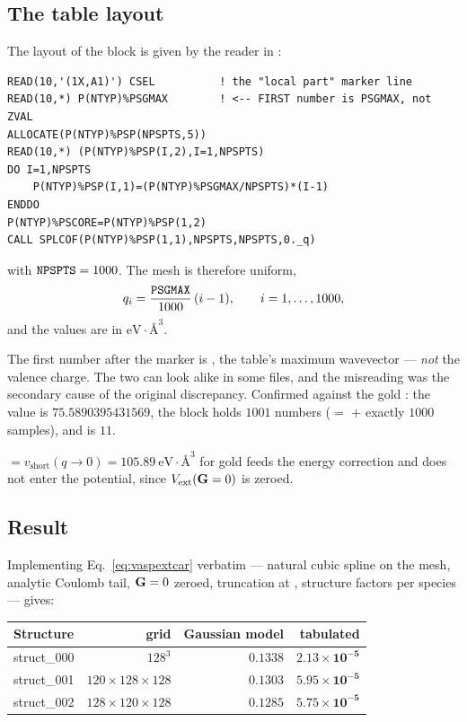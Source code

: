 \subsection{The \texorpdfstring{}{POTCAR} table layout}

The layout of the  block is given by the reader in
:

\begin{lstlisting}[style=fortran]
READ(10,'(1X,A1)') CSEL          ! the "local part" marker line
READ(10,*) P(NTYP)%PSGMAX        ! <-- FIRST number is PSGMAX, not ZVAL
ALLOCATE(P(NTYP)%PSP(NPSPTS,5))
READ(10,*) (P(NTYP)%PSP(I,2),I=1,NPSPTS)
DO I=1,NPSPTS
    P(NTYP)%PSP(I,1)=(P(NTYP)%PSGMAX/NPSPTS)*(I-1)
ENDDO
P(NTYP)%PSCORE=P(NTYP)%PSP(1,2)
CALL SPLCOF(P(NTYP)%PSP(1,1),NPSPTS,NPSPTS,0._q)
\end{lstlisting}

with $\texttt{NPSPTS}=1000$. The mesh is therefore uniform,
\begin{equation}
  q_i = \frac{\texttt{PSGMAX}}{1000}\,(i-1),
  \qquad i = 1,\dots,1000,
\end{equation}
and the values are in $\mathrm{eV}\cdot\text{\AA}^3$.

\begin{pnote}
The first number after the marker is , the table's maximum
wavevector --- \emph{not} the valence charge. The two can look alike in some
files, and the misreading was the secondary cause of the original discrepancy.
Confirmed against the gold : the value is $75.5890395431569$, the
block holds $1001$ numbers ($=$  $+$ exactly $1000$ samples), and
 is $11$.
\end{pnote}

 $= v_{\mathrm{short}}(q\to0) = 105.89\ \mathrm{eV}\cdot\text{\AA}^3$
for gold feeds the  energy correction and does not enter the
potential, since $V_{\mathrm{ext}}(\mathbf{G}=0)$ is zeroed.

\subsection{Result}

Implementing Eq.~\eqref{eq:vaspextcar} verbatim --- natural cubic spline on the
 mesh, analytic Coulomb tail, $\mathbf{G}=0$ zeroed, truncation at
, structure factors per species --- gives:

\begin{center}
\begin{tabular}{@{}lrrr@{}}
\toprule
Structure & grid & Gaussian model & \textbf{tabulated} \\
\midrule
struct\_000 & $128^3$ & $0.1338$ & $\mathbf{2.13\times10^{-5}}$ \\
struct\_001 & $120{\times}128{\times}128$ & $0.1303$ & $\mathbf{5.95\times10^{-5}}$ \\
struct\_002 & $128{\times}120{\times}128$ & $0.1285$ & $\mathbf{5.75\times10^{-5}}$ \\
\bottomrule
\end{tabular}
\end{center}

